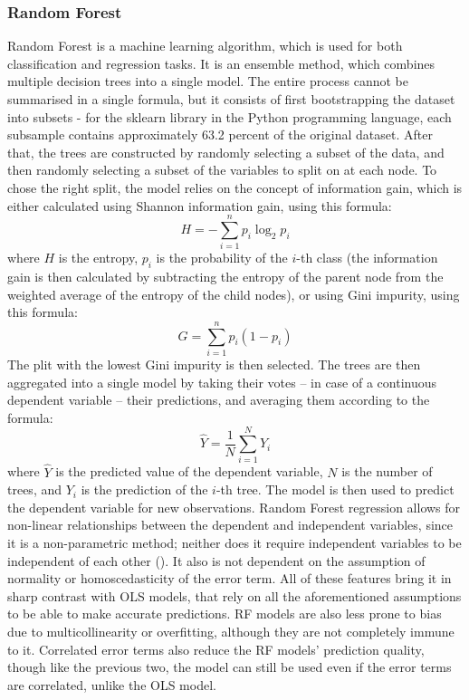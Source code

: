\documentclass[12pt]{report}
\begin{document}
\subsubsection{Random Forest}
Random Forest is a machine learning algorithm, which is used for both classification and regression tasks. It is an ensemble method, which combines multiple decision trees into a single model. The entire process cannot be summarised in a single formula, but it consists of first bootstrapping the dataset into subsets - for the sklearn library in the Python programming language, each subsample contains approximately 63.2 percent of the original dataset\cite{Steorts15}. After that, the trees are constructed by randomly selecting a subset of the data, and then randomly selecting a subset of the variables to split on at each node. To chose the right split, the model relies on the concept of information gain, which is either calculated using Shannon information gain, using this formula:
\begin{equation}
	H = -\sum_{i=1}^{n} p_i \log_2 p_i
\end{equation}
where $H$ is the entropy, $p_i$ is the probability of the $i$-th class (the information gain is then calculated by subtracting the entropy of the parent node from the weighted average of the entropy of the child nodes), or using Gini impurity, using this formula:
\begin{equation}
	G = \sum_{i=1}^{n} p_i (1 - p_i)
\end{equation}
The plit with the lowest Gini impurity is then selected. The trees are then aggregated into a single model by taking their votes -- in case of a continuous dependent variable -- their predictions, and averaging them according to the formula:
\begin{equation}
	\hat{Y} = \frac{1}{N} \sum_{i=1}^{N} Y_i
\end{equation}
where $\hat{Y}$ is the predicted value of the dependent variable, $N$ is the number of trees, and $Y_i$ is the prediction of the $i$-th tree. The model is then used to predict the dependent variable for new observations.
Random Forest regression allows for non-linear relationships between the dependent and independent variables, since it is a non-parametric method; neither does it require independent variables to be independent of each other (\cite{Stekhoven2011}). It also is not dependent on the assumption of normality or homoscedasticity of the error term. All of these features bring it in sharp contrast with OLS models, that rely on all the aforementioned assumptions to be able to make accurate predictions. RF models are also less prone to bias due to multicollinearity or overfitting, although they are not completely immune to it. Correlated error terms also reduce the RF models' prediction quality, though like the previous two, the model can still be used even if the error terms are correlated, unlike the OLS model.
\end{document}
